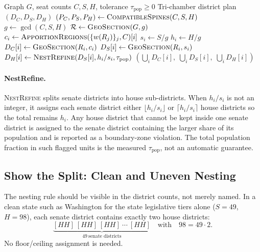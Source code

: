 \begin{algorithm}
\caption{\textsc{NestSection}$(G, C, S, H, \tau_\text{pop})$}
\label{alg:nestsection}
\begin{algorithmic}[1]
\Require Graph $G$, seat counts $C, S, H$, tolerance $\tau_\text{pop} \geq 0$
\Ensure Tri-chamber district plan $(D_C, D_S, D_H)$
\State $(P_C, P_S, P_H) \leftarrow \textsc{CompatibleSpines}(C, S, H)$
\State $g \leftarrow \gcd(C, S, H)$
\State $\mathcal{R} \leftarrow \textsc{GeoSection}(G, g)$
  \State $c_i \leftarrow \textsc{ApportionRegions}(\{w(R_j)\}_j, C)[i]$
  \State $s_i \leftarrow S / g$
  \State $h_i \leftarrow H / g$
  \State $D_C[i] \leftarrow \textsc{GeoSection}(R_i, c_i)$
  \State $D_S[i] \leftarrow \textsc{GeoSection}(R_i, s_i)$
  \State $D_H[i] \leftarrow \textsc{NestRefine}(D_S[i], h_i / s_i, \tau_\text{pop})$
\EndFor
\State \Return $(\bigcup_i D_C[i],\; \bigcup_i D_S[i],\; \bigcup_i D_H[i])$
\end{algorithmic}
\end{algorithm}

\paragraph{NestRefine.}  \textsc{NestRefine} splits senate districts into house
sub-districts.  When $h_i / s_i$ is not an integer, it assigns each senate
district either $\lfloor h_i/s_i \rfloor$ or $\lceil h_i/s_i \rceil$ house
districts so the total remains $h_i$.  Any house district that cannot be kept
inside one senate district is assigned to the senate district containing the
larger share of its population and is reported as a boundary-zone violation.
The total population fraction in such flagged units is the measured
$\tau_\text{pop}$, not an automatic guarantee.

\subsection{Show the Split: Clean and Uneven Nesting}

The nesting rule should be visible in the district counts, not merely named.
In a clean state such as Washington for the state legislative tiers alone
($S=49$, $H=98$), each senate district contains exactly two house districts:
\[
  \underbrace{[HH]\ [HH]\ [HH]\ \cdots\ [HH]}_{49\ \text{senate districts}}
  \quad\text{with}\quad 98 = 49 \cdot 2.
\]
No floor/ceiling assignment is needed.

